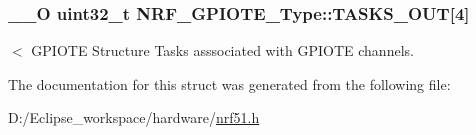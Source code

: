 \subsubsection[{T\+A\+S\+K\+S\+\_\+\+O\+U\+T}]{\setlength{\rightskip}{0pt plus 5cm}\+\_\+\+\_\+\+O uint32\+\_\+t N\+R\+F\+\_\+\+G\+P\+I\+O\+T\+E\+\_\+\+Type\+::\+T\+A\+S\+K\+S\+\_\+\+O\+U\+T\mbox{[}4\mbox{]}}\label{struct_n_r_f___g_p_i_o_t_e___type_af4f60b694c22f54ad4ab9943c49cbfce}
$<$ G\+P\+I\+O\+T\+E Structure Tasks asssociated with G\+P\+I\+O\+T\+E channels. 

The documentation for this struct was generated from the following file\+:\begin{DoxyCompactItemize}
\item 
D\+:/\+Eclipse\+\_\+workspace/hardware/\hyperlink{nrf51_8h}{nrf51.\+h}\end{DoxyCompactItemize}
